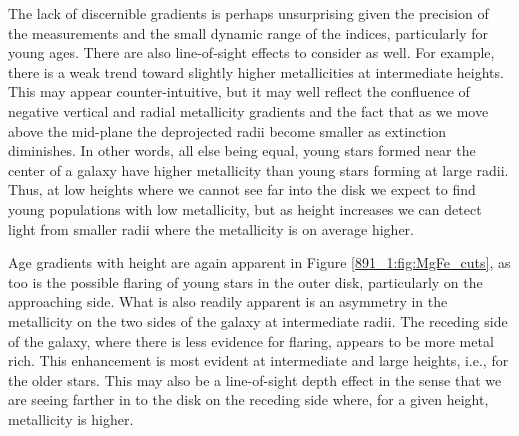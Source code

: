 The lack of discernible gradients is perhaps unsurprising given the
precision of the measurements and the small dynamic range of the
indices, particularly for young ages. There are also line-of-sight
effects to consider as well. For example, there is a weak trend toward
slightly higher metallicities at intermediate heights. This may appear
counter-intuitive, but it may well reflect the confluence of negative
vertical and radial metallicity gradients and the fact that as we move
above the mid-plane the deprojected radii become smaller as extinction
diminishes.  In other words, all else being equal, young stars formed
near the center of a galaxy have higher metallicity than young stars
forming at large radii. Thus, at low heights where we cannot see far
into the disk we expect to find young populations with low
metallicity, but as height increases we can detect light from smaller
radii where the metallicity is on average higher.

Age gradients with height are again apparent in Figure
\ref{891_1:fig:MgFe_cuts}, as too is the possible flaring of young
stars in the outer disk, particularly on the approaching side. What is
also readily apparent is an asymmetry in the metallicity on the two
sides of the galaxy at intermediate radii. The receding side of the
galaxy, where there is less evidence for flaring, appears to be more
metal rich. This enhancement is most evident at intermediate and large
heights, i.e., for the older stars. This may also be a line-of-sight
depth effect in the sense that we are seeing farther in to the disk on
the receding side where, for a given height, metallicity is higher.

